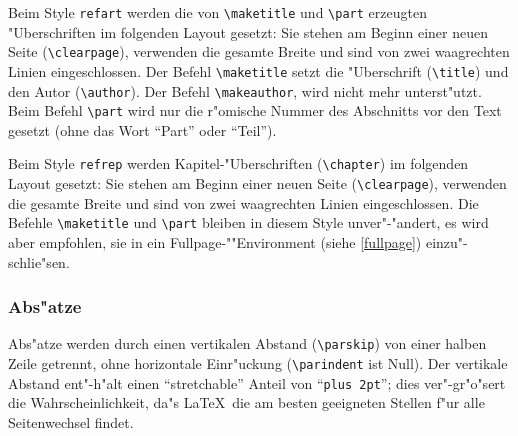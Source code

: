 Beim Style {\tt refart} werden die von \verb|\maketitle| und 
\verb|\part| erzeugten "Uberschriften im folgenden Layout gesetzt: Sie 
stehen am Beginn einer neuen Seite (\verb|\clearpage|), verwenden die 
gesamte Breite und sind von zwei waagrechten Linien eingeschlossen. Der 
Befehl \verb|\maketitle| setzt die "Uberschrift (\verb|\title|) und den 
Autor (\verb|\author|). Der Befehl \verb|\makeauthor|, wird nicht mehr 
unterst"utzt. Beim Befehl \verb|\part| wird nur die r"omische Nummer 
des Abschnitts vor den Text gesetzt (ohne das Wort "`Part"' oder 
"`Teil"').

Beim Style {\tt refrep} werden Kapitel-"Uberschriften 
(\verb|\chapter|) im folgenden Layout gesetzt: Sie stehen am 
Beginn einer neuen Seite (\verb|\clearpage|), verwenden die 
gesamte Breite und sind von zwei waagrechten Linien 
eingeschlossen. Die Befehle \verb|\maketitle| und \verb|\part| 
bleiben in diesem Style unver"-"andert, es wird aber empfohlen, 
sie in ein Fullpage-""Environment (siehe \ref{fullpage}) 
einzu"-schlie"sen.

\subsubsection{Abs"atze}

Abs"atze  werden durch einen vertikalen Abstand (\verb|\parskip|) von 
einer halben Zeile getrennt, ohne horizontale Einr"uckung 
(\verb|\parindent| ist Null). Der vertikale Abstand ent"-h"alt einen 
"`stretchable"' Anteil von "`{\tt plus 2pt}"'; dies ver"-gr"o"sert die 
Wahrscheinlichkeit, da"s \LaTeX\ die am besten geeigneten Stellen f"ur 
alle Seitenwechsel findet.

